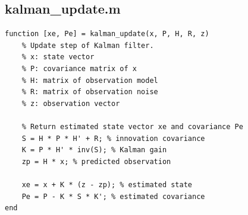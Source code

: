 \documentclass[conference]{IEEEtran}
\begin{document}
        \subsection{kalman\_update.m}
            \begin{lstlisting}[style=Matlab-editor, basicstyle=\scriptsize]
function [xe, Pe] = kalman_update(x, P, H, R, z)
    % Update step of Kalman filter.
    % x: state vector
    % P: covariance matrix of x
    % H: matrix of observation model
    % R: matrix of observation noise
    % z: observation vector

    % Return estimated state vector xe and covariance Pe
    S = H * P * H' + R; % innovation covariance
    K = P * H' * inv(S); % Kalman gain
    zp = H * x; % predicted observation

    xe = x + K * (z - zp); % estimated state
    Pe = P - K * S * K'; % estimated covariance
end
            \end{lstlisting}
\end{document}
